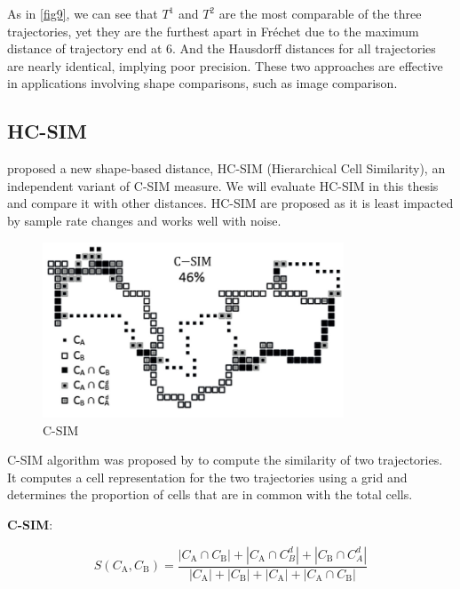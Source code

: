 \documentclass[a4paper, 12pt]{article}
\newcommand{\myequations}[1]{
   \addcontentsline{equ}{myequations}{\protect\numberline{\theequation}#1}
}
\begin{document}
As in \autoref{fig9}, we can see that $T^1$ and $T^2$ are the most comparable of the three trajectories, yet they are the furthest apart in Fréchet due to the maximum distance of trajectory end at 6. And the Hausdorff distances for all trajectories are nearly identical, implying poor precision. These two approaches are effective in applications involving shape comparisons, such as image comparison. 

\subsection{HC-SIM}
\cite{franti2021averaging} proposed a new shape-based distance, HC-SIM (Hierarchical Cell Similarity), an independent variant of C-SIM measure. We will evaluate HC-SIM in this thesis and compare it with other distances. HC-SIM are proposed as it is least impacted by sample rate changes and works well with noise.

\pagebreak

\begin{figure}[htbp!]
    \centering
    \includegraphics[width=0.8\textwidth]{csim.png}
    \caption{C-SIM}
\end{figure}

C-SIM algorithm was proposed by \cite{mariescu2017grid} to compute the similarity of two trajectories. It computes a cell representation for the two trajectories using a grid and determines the proportion of cells that are in common with the total cells. 

\textbf{C-SIM}:

\begin{equation} \label{eq7}
    S\left(C_{\mathrm{A}}, C_{\mathrm{B}}\right)=\frac{\left|C_{\mathrm{A}} \cap C_{\mathrm{B}}\right|+\left|C_{\mathrm{A}} \cap C_{B}^{d}\right|+\left|C_{\mathrm{B}} \cap C_{A}^{d}\right|}{\left|C_{\mathrm{A}}\right|+\left|C_{\mathrm{B}}\right|+\left|C_{\mathrm{A}}\right|+\left|C_{\mathrm{A}} \cap C_{\mathrm{B}}\right|}
\end{equation}
\myequations{C-SIM}
\end{document}
